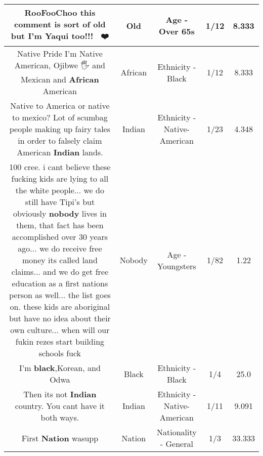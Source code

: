 \documentclass[11pt]{article}
\newlength\mylength
\begin{document}
\begin{center}
\begin{longtable}{|C{.65\mylength}|C{.30\mylength}|C{.12\mylength}|C{.12\mylength}|C{.12\mylength}|}
  \small RooFooChoo this comment is sort of \textbf{old} but I'm Yaqui too!!! ✊🏻❤️\normalsize   & Old & Age - Over 65s & 1/12 & 8.333 \\  \hline
  \small Native Pride I'm Native American, Ojibwe 🖐 and Mexican and \textbf{African} American\normalsize   & African & Ethnicity - Black & 1/12 & 8.333 \\  \hline
  \small Native to America or native to mexico? Lot of scumbag people making up fairy tales in order to falsely claim American \textbf{Indian} lands.\normalsize   & Indian & Ethnicity - Native-American & 1/23 & 4.348 \\  \hline
  \small 100 cree. i cant believe these fucking kids are lying to all the white people... we do still have Tipi's but obviously \textbf{nobody} lives in them, that fact has been accomplished over 30 years ago... we do receive free money its called land claims... and we do get free education as a first nations person as well... the list goes on. these kids are aboriginal but have no idea about their own culture... when will our fukin rezes start building schools fuck\normalsize   & Nobody & Age - Youngsters & 1/82 & 1.22 \\  \hline
  \small I'm \textbf{black},Korean, and Odwa\normalsize   & Black & Ethnicity - Black & 1/4 & 25.0 \\  \hline
  \small Then its not \textbf{Indian} country. You cant have it both ways.\normalsize   & Indian & Ethnicity - Native-American & 1/11 & 9.091 \\  \hline
  \small First \textbf{Nation} wasupp\normalsize   & Nation & Nationality - General & 1/3 & 33.333 \\  \hline

\end{longtable}
\end{center}
\end{document}
